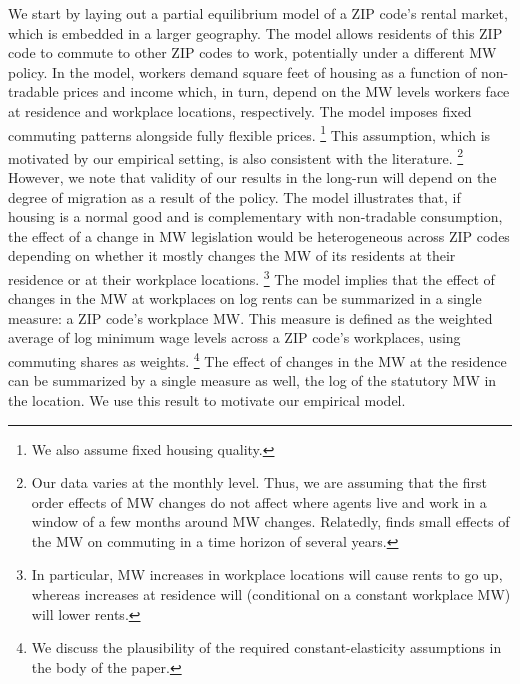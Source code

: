 We start by laying out a partial equilibrium model of a ZIP code's rental market,
which is embedded in a larger geography.
The model allows residents of this ZIP code to commute to other ZIP codes to 
work, potentially under a different MW policy.
In the model, workers demand square feet of housing as a function of non-tradable 
prices and income which, in turn, depend on the MW levels workers face at residence 
and workplace locations, respectively.
The model imposes fixed commuting patterns alongside fully flexible prices.%
\footnote{We also assume fixed housing quality.}
This assumption, which is motivated by our empirical setting, is also consistent 
with the literature.%
\footnote{Our data varies at the monthly level. 
Thus, we are assuming that the first order effects of MW changes do not affect 
where agents live and work in a window of a few months around MW changes.
Relatedly, \textcite{PerezPerez2021} finds small effects of the MW on commuting
in a time horizon of several years.}
However, we note that validity of our results in the long-run will depend on the
degree of migration as a result of the policy.
The model illustrates that, if housing is a normal good and is complementary 
with non-tradable consumption, the effect of a change in MW legislation 
would be heterogeneous across ZIP codes depending on whether it mostly changes 
the MW of its residents at their residence or at their workplace locations.%
\footnote{In particular, MW increases in workplace locations will cause rents to go up,
whereas increases at residence will (conditional on a constant workplace MW)
will lower rents.}
The model implies that the effect of changes in the MW at workplaces on log 
rents can be summarized in a single measure: a ZIP code's workplace MW.
This measure is defined as the weighted average of log minimum wage levels 
across a ZIP code's workplaces, using commuting shares as weights.%
\footnote{We discuss the plausibility of the required constant-elasticity 
assumptions in the body of the paper.}
The effect of changes in the MW at the residence can be summarized by
a single measure as well, the log of the statutory MW in the location.
We use this result to motivate our empirical model.


